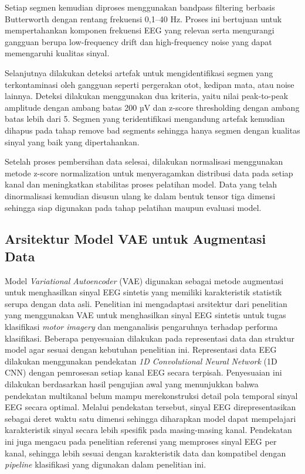 Setiap segmen kemudian diproses menggunakan bandpass filtering berbasis Butterworth dengan rentang frekuensi 0,1–40 Hz. Proses ini bertujuan untuk mempertahankan komponen frekuensi EEG yang relevan serta mengurangi gangguan berupa low-frequency drift dan high-frequency noise yang dapat memengaruhi kualitas sinyal.

Selanjutnya dilakukan deteksi artefak untuk mengidentifikasi segmen yang terkontaminasi oleh gangguan seperti pergerakan otot, kedipan mata, atau noise lainnya. Deteksi dilakukan menggunakan dua kriteria, yaitu nilai peak-to-peak amplitude dengan ambang batas 200 µV dan z-score thresholding dengan ambang batas lebih dari 5. Segmen yang teridentifikasi mengandung artefak kemudian dihapus pada tahap remove bad segments sehingga hanya segmen dengan kualitas sinyal yang baik yang dipertahankan.

Setelah proses pembersihan data selesai, dilakukan normalisasi menggunakan metode z-score normalization untuk menyeragamkan distribusi data pada setiap kanal dan meningkatkan stabilitas proses pelatihan model. Data yang telah dinormalisasi kemudian disusun ulang ke dalam bentuk tensor tiga dimensi sehingga siap digunakan pada tahap pelatihan maupun evaluasi model.
\subsection{Arsitektur Model VAE untuk Augmentasi Data}
\label{Arsitektur Model VAE}

Model \textit{Variational Autoencoder} (VAE) digunakan sebagai metode augmentasi untuk menghasilkan sinyal EEG sintetis yang memiliki karakteristik statistik serupa dengan data asli. Penelitian ini mengadaptasi arsitektur dari penelitian \cite{vae_github} yang menggunakan VAE untuk menghasilkan sinyal EEG sintetis untuk tugas klasifikasi \textit{motor imagery} dan menganalisis pengaruhnya terhadap performa klasifikasi. Beberapa penyesuaian dilakukan pada representasi data dan struktur model agar sesuai dengan kebutuhan penelitian ini. Representasi data EEG dilakukan menggunakan pendekatan \textit{1D Convolutional Neural Network} (1D CNN) dengan pemrosesan setiap kanal EEG secara terpisah. Penyesuaian ini dilakukan berdasarkan hasil pengujian awal yang menunjukkan bahwa pendekatan multikanal belum mampu merekonstruksi detail pola temporal sinyal EEG secara optimal. Melalui pendekatan tersebut, sinyal EEG direpresentasikan sebagai deret waktu satu dimensi sehingga diharapkan model dapat mempelajari karakteristik sinyal secara lebih spesifik pada masing-masing kanal. Pendekatan ini juga mengacu pada penelitian referensi \cite{paper_ref} yang memproses sinyal EEG per kanal, sehingga lebih sesuai dengan karakteristik data dan kompatibel dengan \textit{pipeline} klasifikasi yang digunakan dalam penelitian ini.


